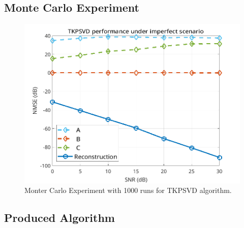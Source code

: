 \documentclass[a4paper,10pt]{article}
\begin{document}
    \subsection*{Monte Carlo Experiment}

    \begin{figure}[ht!]
        \centering 
        \includegraphics[width=0.75\linewidth]{figs/hw12.png} \par 
        \caption{Monter Carlo Experiment with 1000 runs for TKPSVD algorithm.}
        \label{fig:hw12} 
    \end{figure}

    \newpage
    \subsection*{Produced Algorithm}
\end{document}
